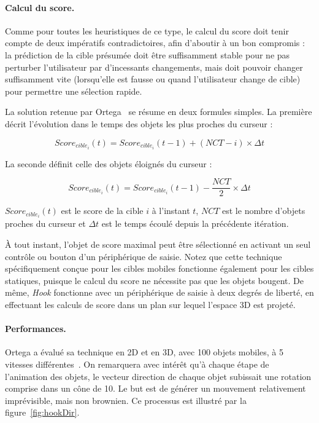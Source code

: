 	\paragraph{Calcul du score.}
	Comme pour toutes les heuristiques de ce type, le calcul du score doit tenir compte de deux impératifs contradictoires, afin d'aboutir à un bon compromis : la prédiction de la cible présumée doit être suffisamment stable pour ne pas perturber l'utilisateur par d'incessants changements, mais doit pouvoir changer suffisamment vite (lorsqu'elle est fausse ou quand l'utilisateur change de cible) pour permettre une sélection rapide.
	
	La solution retenue par Ortega~\cite{ortega2013hook} se résume en deux formules simples. La première décrit l'évolution dans le temps des objets les plus proches du curseur :
	
	$$ Score_{cible_{i}}(t) = Score_{cible_{i}}(t-1) + (NCT - i) \times \Delta{}t $$
	
	La seconde définit celle des objets éloignés du curseur :
	
	$$ Score_{cible_{i}}(t) = Score_{cible_{i}}(t-1) - \frac{NCT}{2} \times \Delta{}t $$
	
	$Score_{cible_{i}}(t)$ est le score de la cible $i$ à l'instant $t$, $NCT$ est le nombre d'objets proches du curseur et $\Delta{}t$ est le temps écoulé depuis la précédente itération.
	
	À tout instant, l'objet de score maximal peut être sélectionné en activant un seul contrôle ou bouton d'un périphérique de saisie. Notez que cette technique spécifiquement conçue pour les cibles mobiles fonctionne également pour les cibles statiques, puisque le calcul du score ne nécessite pas que les objets bougent. De même, \emph{Hook} fonctionne avec un périphérique de saisie à deux degrés de liberté, en effectuant les calculs de score dans un plan sur lequel l'espace 3D est projeté.
	
	\paragraph{Performances.}
	Ortega a évalué sa technique en 2D et en 3D, avec 100 objets mobiles, à 5 vitesses différentes~\cite{ortega2013hook}. On remarquera avec intérêt qu'à chaque étape de l'animation des objets, le vecteur direction de chaque objet subissait une rotation comprise dans un cône de 10\textdegree. Le but est de générer un mouvement relativement imprévisible, mais non brownien. Ce processus est illustré par la figure~\ref{fig:hookDir}.
	
